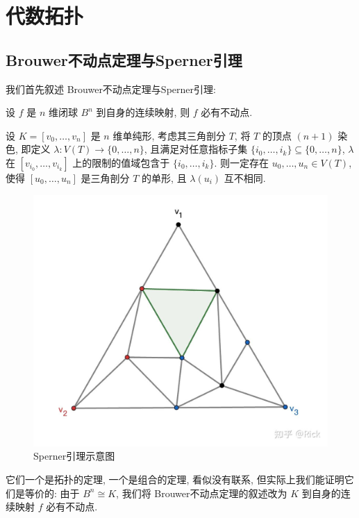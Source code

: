 \chapter{代数拓扑}
    \section{Brouwer不动点定理与Sperner引理}
    我们首先叙述 Brouwer不动点定理与Sperner引理:
    \begin{theorem}[Brouwer不动点定理]
        设 $f$ 是 $n$ 维闭球 $B^n$ 到自身的连续映射, 则 $f$ 必有不动点.
    \end{theorem}
    \begin{lemma}[Sperner引理]
        设 $K=[v_0,\dots,v_n]$ 是 $n$ 维单纯形, 考虑其三角剖分 $T$, 将 $T$ 的顶点 $(n+1)$ 染色, 即定义 $\lambda:V(T)\rightarrow\{0,\dots,n\}$, 且满足对任意指标子集
        $\{i_0,\dots,i_k\}\subseteq\{0,\dots,n\}$, $\lambda$ 在 $[v_{i_0},\dots,v_{i_k}]$ 上的限制的值域包含于 $\{i_0,\dots,i_k\}$. 则一定存在 $u_0,\dots,u_n\in V(T)$, 
        使得 $[u_0,\dots,u_n]$ 是三角剖分 $T$ 的单形, 且 $\lambda(u_i)$ 互不相同.
        \begin{figure}[hbtp]
            \centering
            \includegraphics[scale=0.2]{Figures/SpernerLemma.jpg}
            \caption[SpernerLemma]{Sperner引理示意图}
        \end{figure}
    \end{lemma}

    它们一个是拓扑的定理, 一个是组合的定理, 看似没有联系, 但实际上我们能证明它们是等价的: 由于 $B^n\cong K$, 我们将 Brouwer不动点定理的叙述改为 $K$ 到自身的连续映射 $f$ 必有不动点.


